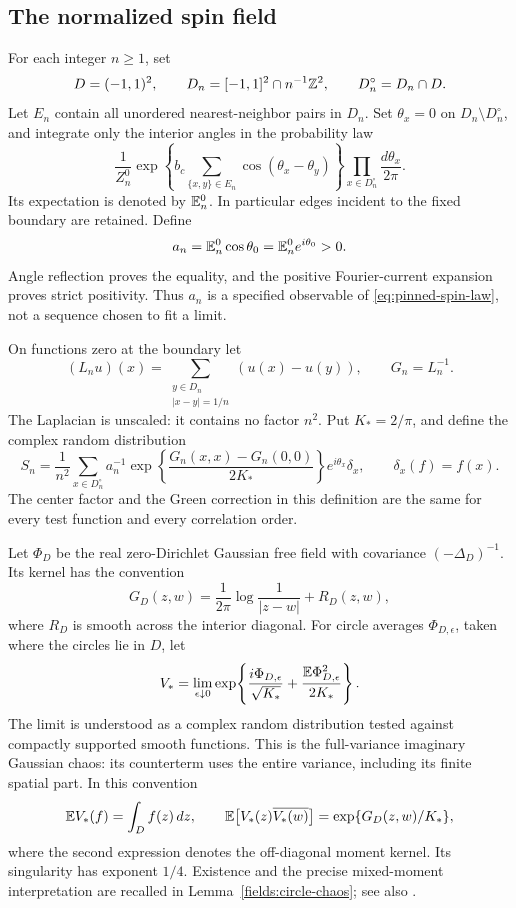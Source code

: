 \subsection{The normalized spin field}

For each integer \(n\ge1\), set
\[
 D=(-1,1)^2,\qquad D_n=[-1,1]^2\cap n^{-1}\mathbb Z^2,
 \qquad D_n^\circ=D_n\cap D.
\]
Let \(E_n\) contain all unordered nearest-neighbor pairs in \(D_n\).
Set \(\theta_x=0\) on \(D_n\setminus D_n^\circ\), and integrate only
the interior angles in the probability law
\begin{equation}\label{eq:pinned-spin-law}
 \frac1{Z_n^0}
 \exp\!\left\{b_c\sum_{\{x,y\}\in E_n}
                         \cos(\theta_x-\theta_y)\right\}
 \prod_{x\in D_n^\circ}\frac{d\theta_x}{2\pi}.
\end{equation}
Its expectation is denoted by \(\mathbb E_n^0\). In particular edges incident
to the fixed boundary are retained. Define
\begin{equation}\label{eq:center-magnetization}
 a_n=\mathbb E_n^0\cos\theta_0=\mathbb E_n^0e^{i\theta_0}>0.
\end{equation}
Angle reflection proves the equality, and the positive Fourier-current
expansion proves strict positivity. Thus \(a_n\) is a specified
observable of \eqref{eq:pinned-spin-law}, not a sequence chosen to fit
a limit.

On functions zero at the boundary let
\[
 (L_nu)(x)=\sum_{\substack{y\in D_n\\|x-y|=1/n}}
                   (u(x)-u(y)),\qquad G_n=L_n^{-1}.
\]
The Laplacian is unscaled: it contains no factor \(n^2\).
Put \(K_*=2/\pi\), and define the complex random distribution
\begin{equation}\label{eq:spin-field}
 S_n=\frac1{n^2}\sum_{x\in D_n^\circ}
 a_n^{-1}\exp\!\left\{\frac{G_n(x,x)-G_n(0,0)}{2K_*}\right\}
 e^{i\theta_x}\delta_x,
 \qquad \delta_x(f)=f(x).
\end{equation}
The center factor and the Green correction in this definition are
the same for every test function and every correlation order.

Let \(\Phi_D\) be the real zero-Dirichlet Gaussian free field with
covariance \((-\Delta_D)^{-1}\). Its kernel has the convention
\[
 G_D(z,w)=\frac1{2\pi}\log\frac1{|z-w|}+R_D(z,w),
\]
where \(R_D\) is smooth across the interior diagonal. For circle
averages \(\Phi_{D,\epsilon}\), taken where the circles lie in \(D\),
let
\begin{equation}\label{eq:target-field}
 V_*=\lim_{\epsilon\downarrow0}
 \exp\!\left\{\frac{i\Phi_{D,\epsilon}}{\sqrt{K_*}}
       +\frac{\mathbb E\Phi_{D,\epsilon}^2}{2K_*}\right\}.
\end{equation}
The limit is understood as a complex random distribution tested
against compactly supported smooth functions. This is the
full-variance imaginary Gaussian chaos: its counterterm uses the
entire variance, including its finite spatial part.
In this convention
\[
 \mathbb E V_*(f)=\int_D f(z)\,dz,\qquad
 \mathbb E\bigl[V_*(z)\overline{V_*(w)}\bigr]
       =\exp\{G_D(z,w)/K_*\},
\]
where the second expression denotes the off-diagonal moment kernel.
Its singularity has exponent \(1/4\). Existence and the precise
mixed-moment interpretation are recalled in
Lemma~\ref{fields:circle-chaos}; see also \cite{JSW2020,B}.

